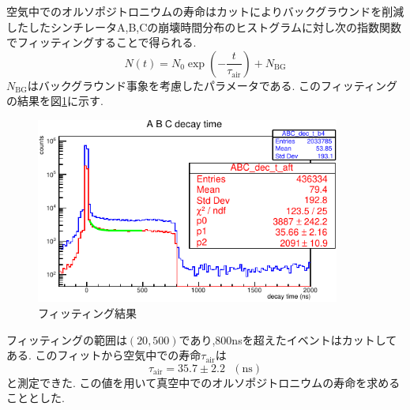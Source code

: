 空気中でのオルソポジトロニウムの寿命はカットによりバックグラウンドを削減したしたシンチレータA,B,Cの崩壊時間分布のヒストグラムに対し次の指数関数でフィッティングすることで得られる.
\begin{equation}
	\nonumber
N(t)=N_0\exp(-\frac{t}{\tau_\textrm{air}})+N_\textrm{BG}
\end{equation}
$N_\textrm{BG}$はバックグラウンド事象を考慮したパラメータである.
このフィッティングの結果を図\ref{fig:life_in_air}に示す.
\begin{figure}[htbp]
	\centering
		\includegraphics[width=10cm]{fig/isb/life_air.pdf}
		\caption{フィッティング結果}
		\label{fig:life_in_air}
\end{figure}
フィッティングの範囲は$(20,500)$であり,800nsを超えたイベントはカットしてある.
このフィットから空気中での寿命$\tau_\textrm{air}$は
\begin{equation}
	\nonumber
	\tau_\textrm{air}=35.7\pm 2.2 \hspace{8pt}(\textrm{ns})
\end{equation}
と測定できた.
この値を用いて真空中でのオルソポジトロニウムの寿命を求めることとした.

